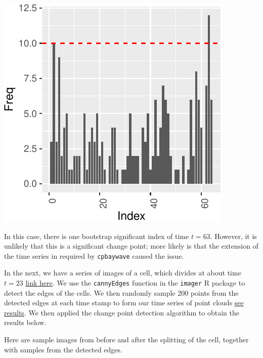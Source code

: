 \documentclass[smallextended]{svjour3}       %
\begin{document}
\begin{center}\includegraphics{springer_template_files/figure-latex/chunk_8-1} \end{center}

In this case, there is one bootstrap significant index of time
\(t = 63\). However, it is unlikely that this is a significant change
point; more likely is that the extension of the time series in required
by \texttt{cpbaywave} caused the issue.

In the next, we have a series of images of a cell, which divides at
about time \(t = 23\)
\href{http://stat.slu.edu/~speegle/cellsRaw.gif}{link here}. We use the
\texttt{cannyEdges} function in the \texttt{imager} R package to detect
the edges of the cells. We then randomly sample 200 points from the
detected edges at each time stamp to form our time series of point
clouds \href{http://stat.slu.edu/~speegle/mycells2.gif}{see results}. We
then applied the change point detection algorithm to obtain the results
below.

Here are sample images from before and after the splitting of the cell,
together with samples from the detected edges.
\end{document}
